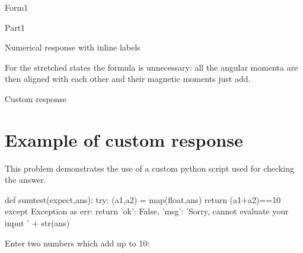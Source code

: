 \begin{edXchapter}{Form1}
\begin{edXsection}{Part1}
\begin{edXvertical}
\begin{edXproblem}{Numerical response with inline labels}{}
\begin{itemize}
     

\end{itemize}

\begin{edXsolution}

For the stretched states the formula is unnecessary: all the angular momenta are
then aligned with each other and their magnetic moments just add. 

\end{edXsolution}

\end{edXproblem}

\end{edXvertical}


\begin{edXvertical}


\begin{edXproblem}{Custom response}

\section{Example of custom response}  

This problem demonstrates the use of a custom python script used for
checking the answer.

\begin{edXscript}

def sumtest(expect,ans):
    try:
        (a1,a2) = map(float,ans)
        return (a1+a2)==10
    except Exception as err:
        return {'ok': False, 'msg': 'Sorry, cannot evaluate your input ' + str(ans)}

\end{edXscript}

Enter two numbers which add up to 10:

%

\end{edXproblem}

\end{edXvertical}



\end{edXsection}
\end{edXchapter}
